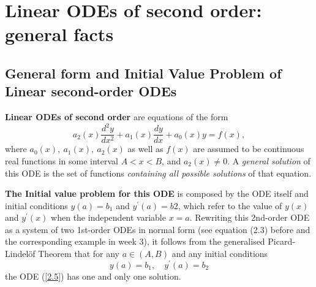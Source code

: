 \documentclass[11pt,a4paper]{article}
\begin{document}
	\mytitle
	\section{Linear ODEs of second order: general facts}
	\subsection{General form and Initial Value Problem of Linear second-order ODEs}
	\textbf{Linear ODEs of second order} are equations of the form
	\begin{equation}\label{2.5}
		a_2(x) \frac{d^2y}{dx^2}+a_1(x)\frac{dy}{dx}+a_0(x)y=f(x),
	\end{equation}
	where $a_0(x),\ a_1(x),\ a_2(x)$ as well as $f(x)$ are assumed to be continuous real functions in some interval $A < x < B$, and $a_2(x) \neq 0$. A \textit{general solution} of this ODE is the set of functions \textit{containing all possible solutions} of that equation.\par
	\textbf{The Initial value problem for this ODE} is composed by the ODE itself and initial conditions $y(a) = b_1$ and $y^\prime (a) = b2$, which refer to the value of $y(x)$ and $y^\prime(x)$ when the independent variable $x = a$. Rewriting this 2nd-order ODE as a system of two 1st-order ODEs in normal form (see equation (2.3) before and the corresponding example in week 3), it follows from the generalised Picard-Lindel\"{o}f Theorem that for any $a \in (A, B)$ and any initial conditions
	\begin{equation}\label{2.6}
		y(a) = b_1,\quad y^\prime(a) = b_2
	\end{equation}
	the ODE (\ref{2.5}) has one and only one solution.
\end{document}
